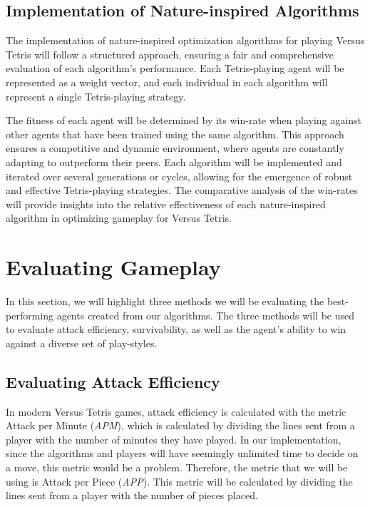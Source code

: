 \documentclass[a4paper, 12pt]{extreport}
\begin{document}
			\subsection{Implementation of Nature-inspired Algorithms}
			
				The implementation of nature-inspired optimization algorithms for playing Versus Tetris will follow a structured approach, ensuring a fair and comprehensive evaluation of each algorithm's performance. Each Tetris-playing agent will be represented as a weight vector, and each individual in each algorithm will represent a single Tetris-playing strategy. 
				
				The fitness of each agent will be determined by its win-rate when playing against other agents that have been trained using the same algorithm. This approach ensures a competitive and dynamic environment, where agents are constantly adapting to outperform their peers. Each algorithm will be implemented and iterated over several generations or cycles, allowing for the emergence of robust and effective Tetris-playing strategies. The comparative analysis of the win-rates will provide insights into the relative effectiveness of each nature-inspired algorithm in optimizing gameplay for Versus Tetris.
		
		\section{Evaluating Gameplay}\label{sec:evaluation}
			
			In this section, we will highlight three methods we will be evaluating the best-performing agents created from our algorithms. The three methods will be used to evaluate attack efficiency, survivability, as well as the agent's ability to win against a diverse set of play-styles.
		
			\subsection{Evaluating Attack Efficiency}
			
				In modern Versus Tetris games, attack efficiency is calculated with the metric Attack per Minute (\textit{APM}), which is calculated by dividing the lines sent from a player with the number of minutes they have played. In our implementation, since the algorithms and players will have seemingly unlimited time to decide on a move, this metric would be a problem. Therefore, the metric that we will be using is Attack per Piece (\textit{APP}). This metric will be calculated by dividing the lines sent from a player with the number of pieces placed.
				
\end{document}
